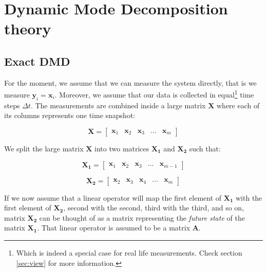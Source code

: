 \documentclass[10pt,twocolumn]{article}
\begin{document}
\section{Dynamic Mode Decomposition theory}\label{sec:theory}

\subsection{Exact DMD}

For the moment, we assume that we can measure the system directly, that is we measure $\mathbf{y}_i = \mathbf{x}_i$. Moreover, we assume that our data is collected in equal\footnote{Which is indeed a special case for real life measurements. Check section \ref{sec:view} for more information.} time steps $\Delta t$. The measurements are combined inside a large matrix $\mathbf{X}$ where each of its columns represents one time snapshot:

\begin{equation} \label{eq:X}
\mathbf{X} = 
\begin{bmatrix}
    \mathbf{x}_1 & \mathbf{x}_2 & \mathbf{x}_3 & \dots & \mathbf{x}_{m}
\end{bmatrix}
\end{equation}

We split the large matrix $\mathbf{X}$ into two matrices $\mathbf{X_1}$ and $\mathbf{X_2}$ such that:

\begin{equation} \label{eq:X1}
\mathbf{X_1} = 
\begin{bmatrix}
    \mathbf{x}_1 & \mathbf{x}_2 & \mathbf{x}_3 & \dots & \mathbf{x}_{m-1}
\end{bmatrix}
\end{equation}

\begin{equation} \label{eq:X2}
\mathbf{X_2} = 
\begin{bmatrix}
    \mathbf{x}_2 & \mathbf{x}_3 & \mathbf{x}_4 & \dots & \mathbf{x}_{m}
\end{bmatrix}
\end{equation}

If we now assume that a linear operator will map the first element of $\mathbf{X_1}$ with the first element of $\mathbf{X_2}$, second with the second, third with the third, and so on, matrix $\mathbf{X_2}$ can be thought of as a matrix representing the \textit{future state} of the matrix $\mathbf{X_1}$. That linear operator is assumed to be a matrix $\mathbf{A}$. 
\end{document}

